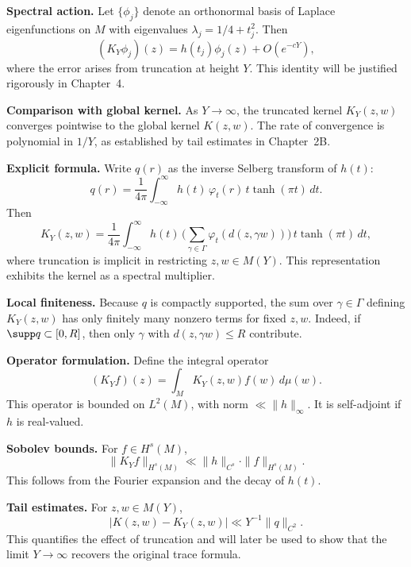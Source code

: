 \medskip

\noindent\textbf{Spectral action.}
Let $\{\phi_{j}\}$ denote an orthonormal basis of Laplace eigenfunctions
on $M$ with eigenvalues $\lambda_{j}=1/4+t_{j}^{2}$.
Then
\[
  (K_{Y}\phi_{j})(z) = h(t_{j})\phi_{j}(z) + O(e^{-cY}),
\]
where the error arises from truncation at height $Y$.
This identity will be justified rigorously in Chapter~4.

\medskip

\noindent\textbf{Comparison with global kernel.}
As $Y\to\infty$,
the truncated kernel $K_{Y}(z,w)$ converges pointwise to the global kernel $K(z,w)$.
The rate of convergence is polynomial in $1/Y$,
as established by tail estimates in Chapter~2B.

\medskip

\noindent\textbf{Explicit formula.}
Write $q(r)$ as the inverse Selberg transform of $h(t)$:
\[
  q(r) = \frac{1}{4\pi}\int_{-\infty}^{\infty} h(t)\,\varphi_{t}(r)\,t\tanh(\pi t)\,dt.
\]
Then
\[
  K_{Y}(z,w) = \frac{1}{4\pi}\int_{-\infty}^{\infty}
  h(t)\,\Bigg(\sum_{\gamma\in\Gamma} \varphi_{t}(d(z,\gamma w))\Bigg)\,
  t\tanh(\pi t)\,dt,
\]
where truncation is implicit in restricting $z,w\in M(Y)$.
This representation exhibits the kernel as a spectral multiplier.

\medskip

\noindent\textbf{Local finiteness.}
Because $q$ is compactly supported,
the sum over $\gamma\in\Gamma$ defining $K_{Y}(z,w)$
has only finitely many nonzero terms for fixed $z,w$.
Indeed, if $\supp q\subset[0,R]$,
then only $\gamma$ with $d(z,\gamma w)\le R$ contribute.

\medskip

\noindent\textbf{Operator formulation.}
Define the integral operator
\[
  (K_{Y}f)(z) = \int_{M} K_{Y}(z,w)f(w)\,d\mu(w).
\]
This operator is bounded on $L^{2}(M)$,
with norm $\ll \|h\|_{\infty}$.
It is self-adjoint if $h$ is real-valued.

\medskip

\noindent\textbf{Sobolev bounds.}
For $f\in H^{s}(M)$,
\[
  \|K_{Y}f\|_{H^{s}(M)} \ll \|h\|_{C^{s}}\cdot \|f\|_{H^{s}(M)}.
\]
This follows from the Fourier expansion and the decay of $h(t)$.

\medskip

\noindent\textbf{Tail estimates.}
For $z,w\in M(Y)$,
\[
  |K(z,w)-K_{Y}(z,w)| \ll Y^{-1}\|q\|_{C^{2}}.
\]
This quantifies the effect of truncation
and will later be used to show that the limit $Y\to\infty$
recovers the original trace formula.

